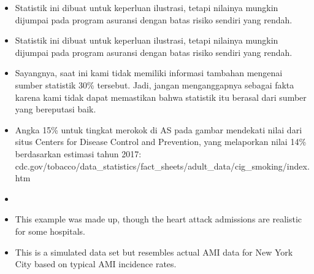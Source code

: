 \begin{itemize}
\item[\ref{geomDist}]
    Statistik ini dibuat untuk keperluan ilustrasi, tetapi nilainya mungkin
    dijumpai pada program asuransi dengan batas risiko sendiri yang rendah.


\item[\ref{binomialModel}]
    Statistik ini dibuat untuk keperluan ilustrasi, tetapi nilainya mungkin
    dijumpai pada program asuransi dengan batas risiko sendiri yang rendah.
\item[\ref{binomialModel}]
    Sayangnya, saat ini kami tidak memiliki informasi tambahan mengenai
    sumber statistik 30\% tersebut. Jadi, jangan menganggapnya sebagai fakta
    karena kami tidak dapat memastikan bahwa statistik itu berasal dari
    sumber yang bereputasi baik.
\item[\ref{binomialModel}]
    Angka 15\% untuk tingkat merokok di AS pada gambar mendekati nilai dari situs
    Centers for Disease Control and Prevention, yang melaporkan nilai 14\%
    berdasarkan estimasi tahun 2017: \\
        {cdc.gov/tobacco/data\_statistics/fact\_sheets/adult\_data/cig\_smoking/index.htm}
\item[\ref{negativeBinomial}]
    \madeup{}
\item[\ref{negativeBinomial}]
    This example was made up, though the heart attack
    admissions are realistic for some hospitals.

\item[\ref{poisson}]
    This is a simulated data set but resembles actual
    AMI data for New York City based on typical AMI
    incidence rates.
\end{itemize}








\section{}
\label{ch_foundations_for_inf_data}

